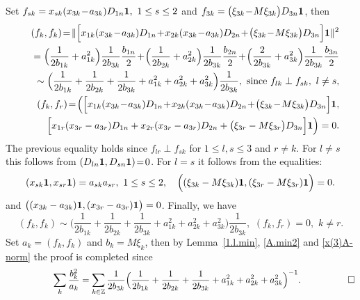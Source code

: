 \documentclass[preprint,12pt]{elsarticle}
\numberwithin{equation}{section}
\begin{document}
\begin{pf}
%
Set $f_{sk}=x_{sk}(x_{3k}\!-\!a_{3k})D_{1n}{\bf 1},\,\,1\leq s\leq 2$ and $f_{3k}=\big(\xi_{3k}\!-\!M\xi_{3k}\big)D_{3n}
{\bf1}$, then 
%
\begin{eqnarray*}
&&(f_k,f_k)\!=\!\Vert\Big[
x_{1k}(x_{3k}\!-\!a_{3k})D_{1n}\!+\!x_{2k}(x_{3k}\!-\!a_{3k})D_{2n}\!+\!\big(\xi_{3k}\!-\!M\xi_{3k}\big)D_{3n}
\Big]{\bf1}\Vert^2\\
%
&&=\Big(\frac{1}{2b_{1k}}+a^2_{1k}\Big)\frac{1}{2b_{3k}}\frac{b_{1n}}{2}\!+\!
\Big(\frac{1}{2b_{2k}}+a^2_{2k}\Big)\frac{1}{2b_{3k}}\frac{b_{2n}}{2}\!+\!
\Big(\frac{2}{2b_{3k}}+a^2_{3k}\Big)\frac{1}{2b_{3k}}\frac{b_{3n}}{2}
 \\
%
&&
\sim\Big(\frac{1}{2b_{1k}}+\frac{1}{2b_{2k}}+\frac{1}{2b_{3k}}+a_{1k}^2+a_{2k}^2+a_{3k}^2\Big)\frac{1}{2b_{3k}},\,\,
\text{since}\,\,f_{lk}\perp f_{sk},\,\,l\not=s,\\
&&(f_k,f_r)\!=\!\Big(
\Big[
x_{1k}(x_{3k}\!-\!a_{3k})D_{1n}\!+\!x_{2k}(x_{3k}\!-\!a_{3k})D_{2n}\!+\!\big(\xi_{3k}\!-\!M\xi_{3k}\big)D_{3n}
\Big]{\bf1},\\
&&\Big[
x_{1r}(x_{3r}-a_{3r})D_{1n}+x_{2r}(x_{3r}-a_{3r})D_{2n}+\big(\xi_{3r}-M\xi_{3r}\big)D_{3n}
\Big]{\bf1}\Big)=0.
\end{eqnarray*}
%
The previous equality holds since  $f_{lr}\perp f_{sk}$ for $1\leq l,s\leq 3$ and $r\!\not=\! k$. For 
$l\not= s$ this follows from 
$(D_{ln}{\bf 1},D_{sn}{\bf 1})\!=\!0$. For $ l\!=\!s$  it follows from the equalities: 
\begin{equation*}
 (x_{sk}{\bf 1},x_{sr}{\bf 1})=a_{sk}a_{sr},\,\,1\leq s\leq 2,\quad \Big((\xi_{3k}-M\xi_{3k}){\bf 1},(\xi_{3r}-M\xi_{3r}){\bf 1}\Big)=0.
\end{equation*}
and $\big((x_{3k}-a_{3k}){\bf 1},(x_{3r}-a_{3r}){\bf 1}\big)=0$. Finally, we have
\begin{equation*}
(f_k,f_k)\!\sim\!
\Big(\frac{1}{2b_{1k}}+\frac{1}{2b_{2k}}+\frac{1}{2b_{3k}}+a_{1k}^2+a_{2k}^2+a_{3k}^2\Big)\frac{1}{2b_{3k}},\,\,
(f_k,f_r)=0,\,\,k\not=r.
\end{equation*}
Set $a_k=(f_k,f_k)$ and $b_k=M\xi_k$, then by  Lemma~\ref{1.l.min}, \eqref{A.min2} and \eqref{x(3)A-norm} the proof is completed since
\begin{equation*}
\hskip 1.8cm 
\sum_{k}\frac{b_k^2}{a_k}=
\sum_{k\in \mathbb Z}\frac{1}{2b_{3k}}\Big(\frac{1}{2b_{1k}}+\frac{1}{2b_{2k}}+\frac{1}{2b_{3k}}+a_{1k}^2+a_{2k}^2+a_{3k}^2\Big)^{-1}.
%
\hskip 1.8cm \Box
\end{equation*}
\end{pf}
%
\end{document}
